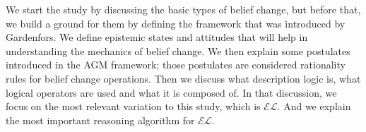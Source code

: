 We start the study by discussing the basic types of belief change, but before that, we build a ground for them by defining the framework that was introduced by Gardenfors. We define epistemic states and attitudes that will help in understanding the mechanics of belief change. We then explain some postulates introduced in the AGM framework; those postulates are considered rationality rules for belief change operations. Then we discuss what description logic is, what logical operators are used and what it is composed of. In that discussion, we focus on the most relevant variation to this study, which is $\mathcal{EL}$. And we explain the most important reasoning algorithm for $\mathcal{EL}$.
